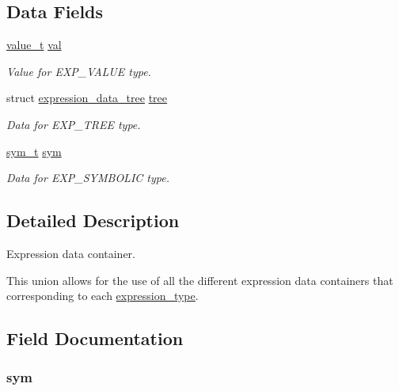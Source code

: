 \subsection*{Data Fields}
\begin{DoxyCompactItemize}
\item 
\hyperlink{types_8h_ae4d4f561b975159d5852cb2c30bf20ef}{value\+\_\+t} \hyperlink{unionexpression__data_a9999269c3069b319f17690c708789d42}{val}
\begin{DoxyCompactList}\small\item\em Value for E\+X\+P\+\_\+\+V\+A\+L\+U\+E type. \end{DoxyCompactList}\item 
struct \hyperlink{structexpression__data__tree}{expression\+\_\+data\+\_\+tree} \hyperlink{unionexpression__data_a786f772ef255a1ea6fbb97622b000bc1}{tree}
\begin{DoxyCompactList}\small\item\em Data for E\+X\+P\+\_\+\+T\+R\+E\+E type. \end{DoxyCompactList}\item 
\hyperlink{symbolic_8h_a32ce0f63fa539078e25332dae6b7c77c}{sym\+\_\+t} \hyperlink{unionexpression__data_a09af8ed794d8611cb68c5b68283c260f}{sym}
\begin{DoxyCompactList}\small\item\em Data for E\+X\+P\+\_\+\+S\+Y\+M\+B\+O\+L\+I\+C type. \end{DoxyCompactList}\end{DoxyCompactItemize}


\subsection{Detailed Description}
Expression data container. 

This union allows for the use of all the different expression data containers that corresponding to each \hyperlink{expression_8h_a5a6601c4e142145f0e87051cb21ece0f}{expression\+\_\+type}. 

\subsection{Field Documentation}
\hypertarget{unionexpression__data_a09af8ed794d8611cb68c5b68283c260f}{
\subsubsection[{sym}]{ {\bf sym}}}\label{unionexpression__data_a09af8ed794d8611cb68c5b68283c260f}


